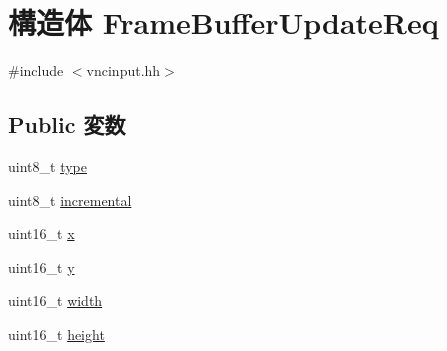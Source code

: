 \hypertarget{structVncInput_1_1FrameBufferUpdateReq}{
\section{構造体 FrameBufferUpdateReq}
\label{structVncInput_1_1FrameBufferUpdateReq}
}


{\ttfamily \#include $<$vncinput.hh$>$}\subsection*{Public 変数}
\begin{DoxyCompactItemize}
\item 
uint8\_\-t \hyperlink{structVncInput_1_1FrameBufferUpdateReq_a1d127017fb298b889f4ba24752d08b8e}{type}
\item 
uint8\_\-t \hyperlink{structVncInput_1_1FrameBufferUpdateReq_a0cf939b984867566c9b2264ef1ff690a}{incremental}
\item 
uint16\_\-t \hyperlink{structVncInput_1_1FrameBufferUpdateReq_a4dde988b1b2adba65ae3efa69f65d960}{x}
\item 
uint16\_\-t \hyperlink{structVncInput_1_1FrameBufferUpdateReq_ab0580f504a7428539be299fa71565f30}{y}
\item 
uint16\_\-t \hyperlink{structVncInput_1_1FrameBufferUpdateReq_ad0eab1042455a2067c812ab8071d5376}{width}
\item 
uint16\_\-t \hyperlink{structVncInput_1_1FrameBufferUpdateReq_a81c9f8d0b8c3b49d770be14dbe9f0d37}{height}
\end{DoxyCompactItemize}


